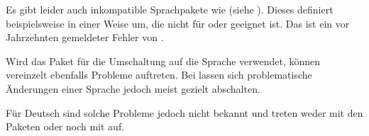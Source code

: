 \iffalse%
Erlauben\textnote{Achtung!} Sie mir noch einen Hinweis zu den
Sprachumschaltpaketen. Das Paket
\Package{french}\IndexPackage{french}\important{\Package{french}} (siehe
\cite{package:french}) nimmt neben der Umdefinierung der Begriffe aus
\autoref{tab:\LabelBase.languageTerms},
\autopageref{tab:\LabelBase.languageTerms} weitere Änderungen vor. So
definiert es etwa die Anweisung \DescRef{scrlttr2.cmd.opening} um. Dabei geht
es einfach davon aus, dass \DescRef{scrlttr2.cmd.opening} immer wie in der
Standardbriefklasse \Class{letter} definiert ist. Dies ist bei \KOMAScript{}
jedoch nicht der Fall. Das Paket \Package{french} zerstört deshalb die
Definition und arbeitet nicht korrekt mir \KOMAScript{} zusammen. Ich
betrachte dies als Fehler des Pakets \Package{french}, der obwohl schon vor
Jahrzehnten gemeldet, leider nie beseitigt wurde.%
\else%
Es gibt leider auch inkompatible Sprachpakete wie
 (siehe
\cite{package:french}). Dieses definiert beispielsweise
 in einer Weise um, die nicht für
 oder  geeignet ist. Das ist ein vor
Jahrzehnten gemeldeter Fehler von .%
\fi

Wird das Paket  für die
Umschaltung auf die Sprache verwendet, können vereinzelt ebenfalls
Probleme auftreten. Bei  lassen sich problematische Änderungen
einer Sprache jedoch meist gezielt abschalten.%
\iftrue%
\iftrue 
  Für Deutsch sind solche Probleme jedoch nicht bekannt  und treten weder
  mit den Paketen  oder
   noch mit  auf.
\else
  Für Deutsch treten solche Probleme mit den Paketen
  \Package{german}\IndexPackage{german},
  \Package{ngerman}\IndexPackage{ngerman} oder \Package{babel} jedoch nicht
  auf.
\fi
\fi

